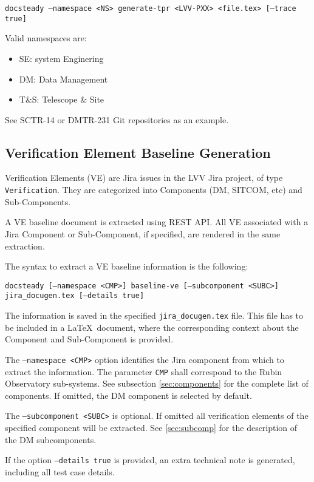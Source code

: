\texttt{docsteady --namespace <NS> generate-tpr <LVV-PXX> <file.tex> [--trace true]}

Valid namespaces are:

\begin{itemize}
\item SE: system Enginering
\item DM: Data Management
\item T\&S: Telescope \& Site
\end{itemize}

See SCTR-14 or DMTR-231 Git repositories as an example.



\subsection{Verification Element Baseline Generation}

Verification Elements (VE) are Jira issues in the LVV Jira project, of type \texttt{Verification}.
They are categorized into Components (DM, SITCOM, etc) and Sub-Components.

A VE baseline document is extracted using REST API.
All VE associated with a Jira Component or Sub-Component, if specified, are rendered in the same extraction.

The syntax to extract a VE baseline information is the following:

\texttt{docsteady [--namespace <CMP>] baseline-ve [--subcomponent <SUBC>] jira\_docugen.tex [--details true]}

The information is saved in the specified \texttt{jira\_docugen.tex} file.
This file has to be included in a \LaTeX~document, where the corresponding context about the Component and Sub-Component is provided.

The \texttt{--namespace <CMP>} option identifies the Jira component from which to extract the information.
The parameter \texttt{CMP} shall correspond to the Rubin Observatory sub-systems.
See subsection \ref{sec:components} for the complete list of components.
If omitted, the DM component is selected by default.

The \texttt{--subcomponent <SUBC>} is optional. If omitted all verification elements of the specified component will be extracted. 
See \ref{sec:subcomp} for the description of the DM subcomponents.

If the option \texttt{--details true} is provided, an extra technical note is generated, including all test case details.

